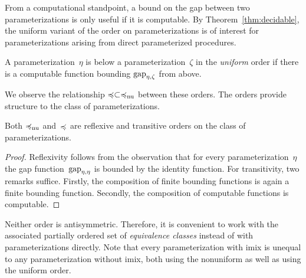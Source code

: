 From a computational standpoint, a bound on the gap between two parameterizations is only useful if it is computable.
By Theorem~\ref{thm:decidable}, the uniform variant of the order on parameterizations is of interest for parameterizations arising from direct parameterized procedures.

\begin{definition}
\label{def:uniform_order}%
  A parameterization~$\eta$ is below a parameterization~$\zeta$ in the \emph{uniform} order  if there is a computable function bounding $\operatorname{gap}_{\eta, \zeta}$ from above.
\end{definition}

We observe the relationship $\preccurlyeq \subset \preccurlyeq_\mathrm{nu}$ between these orders.
The orders provide structure to the class of parameterizations.
\begin{lemma}
\label{lem:preorder}%
  Both $\preccurlyeq_\mathrm{nu}$ and~$\preccurlyeq$ are reflexive and transitive orders on the class of parameterizations.
\end{lemma}
\begin{proof}
  Reflexivity follows from the observation that for every parameterization~$\eta$ the gap function~$\operatorname{gap}_{\eta, \eta}$ is bounded by the identity function.
  For transitivity, two remarks suffice.
  Firstly, the composition of finite bounding functions is again a finite bounding function.
  Secondly, the composition of computable functions is computable.
\end{proof}

Neither order is antisymmetric.
Therefore, it is convenient to work with the associated partially ordered set of \emph{equivalence classes} instead of with parameterizations directly.
Note that every parameterization with imix is unequal to any parameterization without imix, both using the nonuniform as well as using the uniform order.

